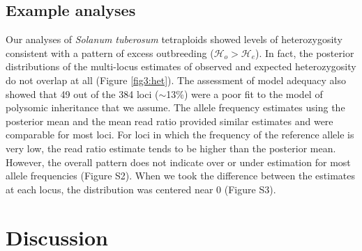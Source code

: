 \documentclass[11pt,english,letterpaper,oneside]{article}
\begin{document}
\medskip
\subsection{Example analyses}
\medskip

Our analyses of \textit{Solanum tuberosum} tetraploids showed levels of heterozygosity consistent with a pattern of excess outbreeding ($\mathcal{H}_o > \mathcal{H}_e$). In fact, the posterior distributions of the multi-locus estimates of observed and expected heterozygosity do not overlap at all (Figure \ref{fig3:het}). The assessment of model adequacy also showed that 49 out of the 384 loci ($\sim$13\%) were a poor fit to the model of polysomic inheritance that we assume. The allele frequency estimates using the posterior mean and the mean read ratio provided similar estimates and were comparable for most loci. For loci in which the frequency of the reference allele is very low, the read ratio estimate tends to be higher than the posterior mean. However, the overall pattern does not indicate over or under estimation for most allele frequencies (Figure S2). When we took the difference between the estimates at each locus, the distribution was centered near 0 (Figure S3).
\medskip

\section{Discussion}         %
\end{document}
